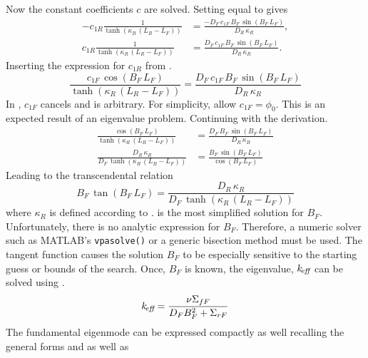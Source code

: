   Now the constant coefficients $c$ are solved. Setting  
  equal to  gives
  \begin{align}
    -c_{1R} \frac{1}{\tanh(\kappa_R\,(L_R-L_F))}
      &= \frac{-D_F \, c_{1F} \, B_F \, \sin(B_F \, L_F)}{D_R\,\kappa_R}, \\
    c_{1R} \frac{1}{\tanh(\kappa_R\,(L_R-L_F))}
      &= \frac{D_F \, c_{1F} \, B_F \, \sin(B_F \, L_F)}{D_R\,\kappa_R}.
  \end{align}
  Inserting the expression for $c_{1R}$ from .
  \begin{equation}
    \label{eq:2reg_c1f_arbitrary}
    \frac{c_{1F} \, \cos(B_F \, L_F)}{\tanh(\kappa_R \, (L_R-L_F))} =
      \frac{D_F \, c_{1F} \, B_F \, \sin(B_F \, L_F)}{D_R \, \kappa_R}
  \end{equation}
  In , $c_{1F}$ cancels and is arbitrary. For
  simplicity, allow $c_{1F} = \phi_0$.
  This is an expected result of an eigenvalue problem. Continuing with the
  derivation.
  \begin{align}
    \frac{\cos(B_F \, L_F)}{\tanh(\kappa_R \, (L_R-L_F))} &=
      \frac{D_F \, B_F \, \sin(B_F \, L_F)}{D_R \, \kappa_R} \\
    \frac{D_R \, \kappa_R}{D_F \, \tanh(\kappa_R \, (L_R - L_F))} &= 
      \frac{B_F \, \sin(B_F \, L_F)}{\cos(B_F \, L_F)}
  \end{align}
  Leading to the transcendental relation
  \begin{equation}
    \label{eq:2reg_bf}
    B_F \, \tan(B_F \, L_F) = \frac{D_R \, \kappa_R}{D_F \, \tanh(\kappa_R \, (L_R-L_F))}
  \end{equation}
  where $\kappa_R$ is defined according to . 
   is the most simplified solution for $B_F$. Unfortunately,
  there is no analytic expression for $B_F$. Therefore, a numeric solver 
  such as MATLAB's \verb|vpasolve()| or a generic bisection method must be used.
  The tangent function causes the solution $B_F$ to be especially sensitive to 
  the starting guess or bounds of the search. Once, $B_F$ is known, the 
  eigenvalue, $k_{\!\mbox{\scriptsize \em eff}}$ can be solved using .
  \begin{equation}
    \label{eq:keff2reg}
    k_{\!\mbox{\scriptsize \em eff}} = \frac{\nu \Sigma_{fF}}{D_F B_F^2 + \Sigma_{rF}}
  \end{equation}
  The fundamental eigenmode can be expressed compactly as well recalling the
  general forms  and  as well as
